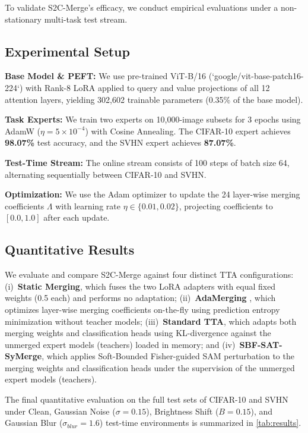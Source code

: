 \documentclass{article}
\theoremstyle{plain}
\theoremstyle{definition}
\theoremstyle{remark}
\begin{document}
To validate S2C-Merge's efficacy, we conduct empirical evaluations under a non-stationary multi-task test stream.

\subsection{Experimental Setup}
\textbf{Base Model \& PEFT:} We use pre-trained ViT-B/16 (`google/vit-base-patch16-224`) with Rank-8 LoRA \cite{hu2021lora} applied to query and value projections of all 12 attention layers, yielding 302,602 trainable parameters (0.35\% of the base model).

\textbf{Task Experts:} We train two experts on 10,000-image subsets for 3 epochs using AdamW ($\eta = 5\times 10^{-4}$) with Cosine Annealing. The CIFAR-10 expert achieves \textbf{98.07\%} test accuracy, and the SVHN expert achieves \textbf{87.07\%}.

\textbf{Test-Time Stream:} The online stream consists of 100 steps of batch size 64, alternating sequentially between CIFAR-10 and SVHN.

\textbf{Optimization:} We use the Adam optimizer to update the 24 layer-wise merging coefficients $\Lambda$ with learning rate $\eta \in \{0.01, 0.02\}$, projecting coefficients to $[0.0, 1.0]$ after each update.

\subsection{Quantitative Results}
We evaluate and compare S2C-Merge against four distinct TTA configurations: (i)~\textbf{Static Merging}, which fuses the two LoRA adapters with equal fixed weights (0.5 each) and performs no adaptation; (ii)~\textbf{AdaMerging} \cite{yang2024adamerging}, which optimizes layer-wise merging coefficients on-the-fly using prediction entropy minimization without teacher models; (iii)~\textbf{Standard TTA}, which adapts both merging weights and classification heads using KL-divergence against the unmerged expert models (teachers) loaded in memory; and (iv)~\textbf{SBF-SAT-SyMerge}, which applies Soft-Bounded Fisher-guided SAM perturbation to the merging weights and classification heads under the supervision of the unmerged expert models (teachers).

The final quantitative evaluation on the full test sets of CIFAR-10 and SVHN under Clean, Gaussian Noise ($\sigma=0.15$), Brightness Shift ($B=0.15$), and Gaussian Blur ($\sigma_{blur}=1.6$) test-time environments is summarized in \cref{tab:results}.
\end{document}
